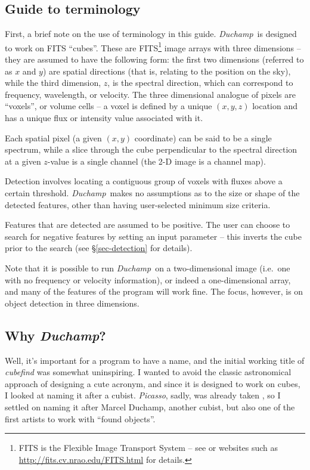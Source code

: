 \documentclass[12pt,a4paper]{article}
\newcommand{\ie}{i.e.\ }
\newcommand{\duchamp}{\emph{Duchamp}}
\begin{document}
\subsection{Guide to terminology}

First, a brief note on the use of terminology in this guide. \duchamp\
is designed to work on FITS ``cubes''. These are FITS\footnote{FITS is
the Flexible Image Transport System -- see \citet{hanisch01} or
websites such as 
\href{http://fits.cv.nrao.edu/FITS.html}{http://fits.cv.nrao.edu/FITS.html}
for details.} image arrays with three dimensions -- they are assumed
to have the following form: the first two dimensions (referred to as
$x$ and $y$) are spatial directions (that is, relating to the position
on the sky), while the third dimension, $z$, is the spectral
direction, which can correspond to frequency, wavelength, or
velocity. The three dimensional analogue of pixels are ``voxels'', or
volume cells -- a voxel is defined by a unique $(x,y,z)$ location and
has a unique flux or intensity value associated with it.

Each spatial pixel (a given $(x,y)$ coordinate) can be said to be a
single spectrum, while a slice through the cube perpendicular to the
spectral direction at a given $z$-value is a single channel (the 2-D
image is a channel map).

Detection involves locating a contiguous group of voxels with fluxes
above a certain threshold. \duchamp\ makes no assumptions as to the
size or shape of the detected features, other than having
user-selected minimum size criteria.

Features that are detected are assumed to be positive. The user can
choose to search for negative features by setting an input parameter
-- this inverts the cube prior to the search (see
\S\ref{sec-detection} for details).

Note that it is possible to run \duchamp\ on a two-dimensional image
(\ie one with no frequency or velocity information), or indeed a
one-dimensional array, and many of the features of the program will
work fine. The focus, however, is on object detection in three
dimensions.

\subsection{Why \duchamp?}

Well, it's important for a program to have a name, and the initial
working title of \emph{cubefind} was somewhat uninspiring. I wanted to
avoid the classic astronomical approach of designing a cute acronym,
and since it is designed to work on cubes, I looked at naming it after
a cubist. \emph{Picasso}, sadly, was already taken \citep{minchin99},
so I settled on naming it after Marcel Duchamp, another cubist, but
also one of the first artists to work with ``found objects''.
\end{document}

